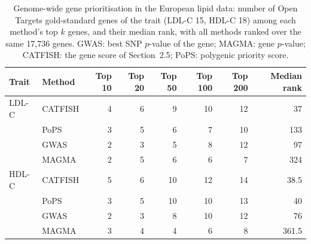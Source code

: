 \begin{table}[!t]
\centering
\caption{Genome-wide gene prioritisation in the European lipid data: number of Open Targets gold-standard genes of the trait (LDL-C 15, HDL-C 18) among each method's top $k$ genes, and their median rank, with all methods ranked over the same 17{,}736 genes. GWAS: best SNP $p$-value of the gene; MAGMA: gene $p$-value; CATFISH: the gene score of Section~2.5; PoPS: polygenic priority score.}
\label{tab:pops_topk}
\small
\begin{tabular}{llrrrrrr}
\hline
\textbf{Trait} & \textbf{Method} & Top 10 & Top 20 & Top 50 & Top 100 & Top 200 & Median rank \\
\hline
LDL-C & CATFISH & 4 & 6 & 9 & 10 & 12 & 37 \\
 & PoPS & 3 & 5 & 6 & 7 & 10 & 133 \\
 & GWAS & 2 & 3 & 5 & 8 & 12 & 97 \\
 & MAGMA & 2 & 5 & 6 & 6 & 7 & 324 \\
\hline
HDL-C & CATFISH & 5 & 6 & 10 & 12 & 14 & 38.5 \\
 & PoPS & 3 & 5 & 10 & 10 & 13 & 40 \\
 & GWAS & 2 & 3 & 8 & 10 & 12 & 76 \\
 & MAGMA & 3 & 4 & 4 & 6 & 8 & 361.5 \\
\hline
\end{tabular}
\end{table}

